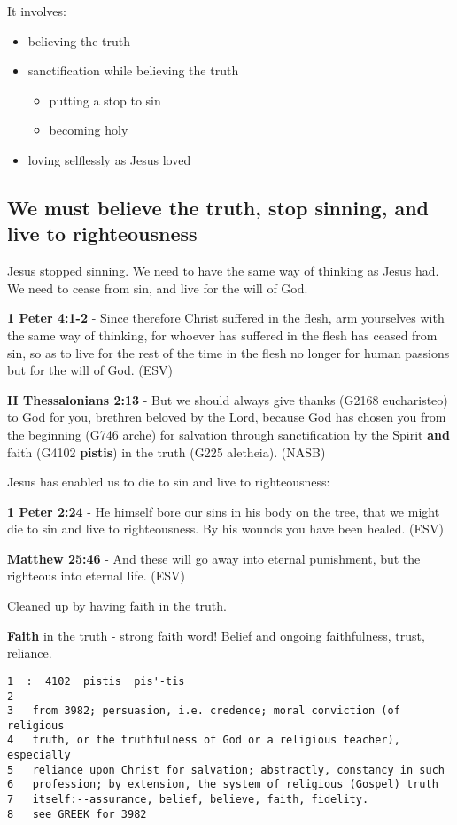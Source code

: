 \documentclass[11pt]{article}
\begin{document}
It involves:
\begin{itemize}
\item believing the truth
\item sanctification while believing the truth
\begin{itemize}
\item putting a stop to sin
\item becoming holy
\end{itemize}
\item loving selflessly as Jesus loved
\end{itemize}

\subsection{We must believe the truth, stop sinning, and live to righteousness}
\label{sec:org9e150a5}
Jesus stopped sinning. We need to have the same way of thinking as Jesus had.
We need to cease from sin, and live for the will of God.

\textbf{1 Peter 4:1-2} - Since therefore Christ suffered in the flesh, arm yourselves with the same way of thinking, for whoever has suffered in the flesh has ceased from sin, so as to live for the rest of the time in the flesh no longer for human passions but for the will of God. (ESV)

\textbf{II Thessalonians 2:13} - But we should always give thanks (G2168 eucharisteo) to God for you, brethren beloved by the Lord, because God has chosen you from the beginning (G746 arche) for salvation through sanctification by the Spirit \textbf{and} faith (G4102 \textbf{pistis}) in the truth (G225 aletheia). (NASB)

Jesus has enabled us to die to sin and live to righteousness:

\textbf{1 Peter 2:24} - He himself bore our sins in his body on the tree, that we might die to sin and live to righteousness.  By his wounds you have been healed.  (ESV)

\textbf{Matthew 25:46} - And these will go away into eternal punishment, but the righteous into eternal life. (ESV)

Cleaned up by having faith in the truth.

\textbf{Faith} in the truth - strong faith word! Belief and ongoing faithfulness, trust, reliance.

\begin{verbatim}
1  :  4102  pistis  pis'-tis
2  
3   from 3982; persuasion, i.e. credence; moral conviction (of religious
4   truth, or the truthfulness of God or a religious teacher), especially
5   reliance upon Christ for salvation; abstractly, constancy in such
6   profession; by extension, the system of religious (Gospel) truth
7   itself:--assurance, belief, believe, faith, fidelity.
8   see GREEK for 3982
\end{verbatim}
\end{document}
